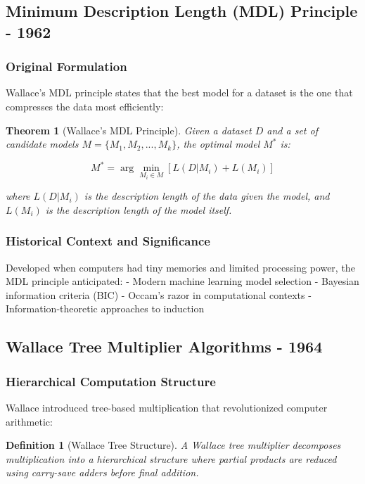 \documentclass[12pt]{article}
\newtheorem{theorem}{Theorem}
\newtheorem{definition}{Definition}
\begin{document}
\subsection{Minimum Description Length (MDL) Principle - 1962}

\subsubsection{Original Formulation}

Wallace's MDL principle \cite{wallace_mdl_1962} states that the best model for a dataset is the one that compresses the data most efficiently:

\begin{theorem}[Wallace's MDL Principle]
Given a dataset $D$ and a set of candidate models $M = \{M_1, M_2, ..., M_k\}$, the optimal model $M^*$ is:

\begin{equation}
M^* = \arg\min_{M_i \in M} \left[ L(D|M_i) + L(M_i) \right]
\end{equation}

where $L(D|M_i)$ is the description length of the data given the model, and $L(M_i)$ is the description length of the model itself.
\end{theorem}

\subsubsection{Historical Context and Significance}

Developed when computers had tiny memories and limited processing power, the MDL principle anticipated:
- Modern machine learning model selection
- Bayesian information criteria (BIC)
- Occam's razor in computational contexts
- Information-theoretic approaches to induction

\subsection{Wallace Tree Multiplier Algorithms - 1964}

\subsubsection{Hierarchical Computation Structure}

Wallace introduced tree-based multiplication that revolutionized computer arithmetic:

\begin{definition}[Wallace Tree Structure]
A Wallace tree multiplier decomposes multiplication into a hierarchical structure where partial products are reduced using carry-save adders before final addition.
\end{definition}
\end{document}
